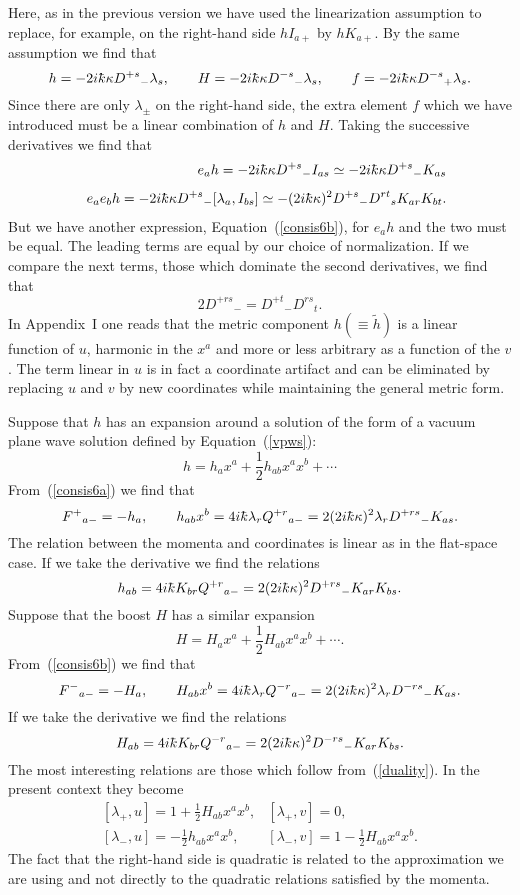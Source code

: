 \documentclass[12pt,a4paper]{article}
\newcounter{eg}
\def\t#1{\tilde #1}
\def\kbar{{\mathchar'26\mkern-9muk}}
\begin{document}
Here, as in the previous version we have used the linearization
assumption to replace, for example, on the right-hand side 
$h I_{a+}$ by $h K_{a+}$. By the same assumption we find that
$$
h = -2i\kbar \kappa D^{+s}{}_- \lambda_s,\qquad
H = -2i\kbar \kappa D^{-s}{}_- \lambda_s,\qquad
f = -2i\kbar \kappa D^{-s}{}_+ \lambda_s.
$$
Since there are only $\lambda_\pm$ on the right-hand side, the extra
element $f$ which we have introduced must be a linear combination of
$h$ and $H$. Taking the successive derivatives we find that
\begin{eqnarray*}
&&e_a h = -2i\kbar \kappa D^{+s}{}_- I_{as} \simeq 
-2i\kbar \kappa D^{+s}{}_- K_{as}\\[4pt]
&&e_a e_b h = -2i\kbar \kappa D^{+s}{}_- [\lambda_a, I_{bs}]
\simeq -(2i\kbar \kappa)^2 D^{+s}{}_- D^{rt}{}_s K_{ar} K_{bt}.
\end{eqnarray*}
But we have another expression, Equation~(\ref{consis6b}), for $e_a h$
and the two must be equal. The leading terms are equal by our choice
of normalization. If we compare the next terms, those which dominate
the second derivatives, we find that
$$
2 D^{+rs}{}_- = D^{+t}{}_- D^{rs}{}_t.
$$
In Appendix~I one reads that the metric component $h(\equiv \t{h})$
is a linear function of $u$, harmonic in the $x^a$ and more or less
arbitrary as a function of the $v$.  The term linear in $u$ is in fact
a coordinate artifact and can be eliminated by replacing $u$ and $v$
by new coordinates while maintaining the general metric form. 

Suppose that $h$ has an expansion around a solution of the form of a
vacuum plane wave solution defined by Equation~(\ref{vpws}):
$$
h = h_ax^a + \frac 12 h_{ab} x^a x^b + \cdots
$$
From~(\ref{consis6a}) we find that
$$
F^+{}_{a-} = -h_a, \qquad h_{ab} x^b = 4i\kbar \lambda_r Q^{+r}{}_{a-}
= 2(2i\kbar\kappa)^2 \lambda_r  D^{+rs}{}_- K_{as}.
$$
The relation between the momenta and coordinates is linear as in the
flat-space case. If we take the derivative we find the relations
$$
h_{ab} = 4i\kbar K_{br} Q^{+r}{}_{a-}
= 2(2i\kbar\kappa)^2 D^{+rs}{}_- K_{ar} K_{bs}.
$$
Suppose that the boost $H$ has a similar expansion
$$
H = H_ax^a + \frac 12 H_{ab} x^a x^b + \cdots.
$$
From~(\ref{consis6b}) we find that
$$
F^-{}_{a-} = -H_a, \qquad 
H_{ab} x^b = 4i\kbar \lambda_r Q^{-r}{}_{a-}
= 2(2i\kbar\kappa)^2 \lambda_r  D^{-rs}{}_- K_{as}.
$$
If we take the derivative we find the relations
$$
H_{ab} = 4i\kbar K_{br} Q^{-r}{}_{a-}
= 2(2i\kbar\kappa)^2 D^{-rs}{}_- K_{ar} K_{bs}.
$$
The most interesting relations are those which follow
from~(\ref{duality}). In the present context they become
$$
\begin{array}{ll}
[\lambda_+,u] = 1 + \frac 12 H_{ab}x^a x^b, &
[\lambda_+,v] = 0,\\[4pt]
[\lambda_-,u] = - \frac 12 h_{ab}x^a x^b, &
[\lambda_-,v] = 1 - \frac 12 H_{ab}x^a x^b.
\end{array}
$$
The fact that the right-hand side is quadratic is related to the
approximation we are using and not directly to the quadratic relations
satisfied by the momenta.
\end{document}
